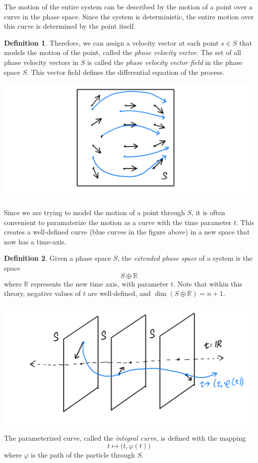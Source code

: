 \documentclass{article}
\theoremstyle{remark}
\theoremstyle{definition}
\newtheorem{definition}{Definition}[section]
\begin{document}
    The motion of the entire system can be described by the motion of a point over a curve in the phase space. Since the system is deterministic, the entire motion over this curve is determined by the point itself. 
    \begin{definition}
    Therefore, we can assign a velocity vector at each point $s \in S$ that models the motion of the point, called the \textit{phase velocity vector}. The set of all phase velocity vectors in $S$ is called the \textit{phase velocity vector field} in the phase space $S$. This vector field defines the differential equation of the process. 
    \begin{center}
      \includegraphics[scale=0.25]{img/Phase_Velocity_Vector_Field.PNG}
    \end{center}
    Since we are trying to model the motion of a point through $S$, it is often convenient to paramaterize the motion as a curve with the time parameter $t$. This creates a well-defined curve (blue curves in the figure above) in a new space that now has a time-axis. 
    \end{definition}


    \begin{definition}
      Given a phase space $S$, the \textit{extended phase space} of a system is the space 
      \[S \oplus \mathbb{R}\]
      where $\mathbb{R}$ represents the new time axis, with parameter $t$. Note that within this theory, negative values of $t$ are well-defined, and $\dim{(S \oplus \mathbb{R})} = n+1$. 
      \begin{center}
        \includegraphics[scale=0.25]{img/Extended_Phase_Space.PNG}
      \end{center}
      The parameterized curve, called the \textit{integral curve}, is defined with the mapping
      \[t \mapsto \big( t, \varphi(t) \big)\]
      where $\varphi$ is the path of the particle through $S$. 
    \end{definition}
\end{document}
